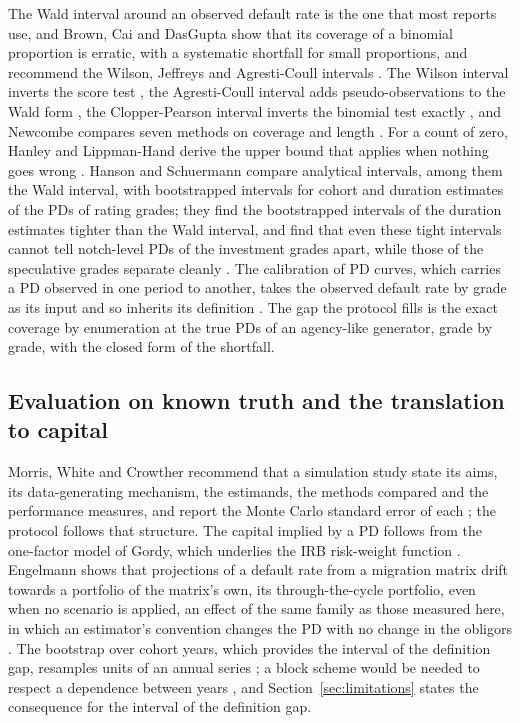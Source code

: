 The Wald interval around an observed default rate is the one that most reports use, and Brown, Cai and DasGupta show that its coverage of a binomial proportion is erratic, with a systematic shortfall for small proportions, and recommend the Wilson, Jeffreys and Agresti-Coull intervals \citep{Brown_2001}. The Wilson interval inverts the score test \citep{Wilson_1927}, the Agresti-Coull interval adds pseudo-observations to the Wald form \citep{Agresti_1998}, the Clopper-Pearson interval inverts the binomial test exactly \citep{Clopper_1934}, and Newcombe compares seven methods on coverage and length \citep{Newcombe_1998}. For a count of zero, Hanley and Lippman-Hand derive the upper bound that applies when nothing goes wrong \citep{Hanley_1983}. Hanson and Schuermann compare analytical intervals, among them the Wald interval, with bootstrapped intervals for cohort and duration estimates of the PDs of rating grades; they find the bootstrapped intervals of the duration estimates tighter than the Wald interval, and find that even these tight intervals cannot tell notch-level PDs of the investment grades apart, while those of the speculative grades separate cleanly \citep{Hanson_2006,Schuermann_2004}. The calibration of PD curves, which carries a PD observed in one period to another, takes the observed default rate by grade as its input and so inherits its definition \citep{Tasche_2013}. The gap the protocol fills is the exact coverage by enumeration at the true PDs of an agency-like generator, grade by grade, with the closed form of the shortfall.

\subsection{Evaluation on known truth and the translation to capital}
\label{sec:rw-evaluation}

Morris, White and Crowther recommend that a simulation study state its aims, its data-generating mechanism, the estimands, the methods compared and the performance measures, and report the Monte Carlo standard error of each \citep{Morris_2019}; the protocol follows that structure. The capital implied by a PD follows from the one-factor model of Gordy, which underlies the IRB risk-weight function \citep{Gordy_2003,BCBS_CRE31}. Engelmann shows that projections of a default rate from a migration matrix drift towards a portfolio of the matrix's own, its through-the-cycle portfolio, even when no scenario is applied, an effect of the same family as those measured here, in which an estimator's convention changes the PD with no change in the obligors \citep{Engelmann_2024}. The bootstrap over cohort years, which provides the interval of the definition gap, resamples units of an annual series \citep{Efron_1979}; a block scheme would be needed to respect a dependence between years \citep{Kunsch_1989}, and Section~\ref{sec:limitations} states the consequence for the interval of the definition gap.

